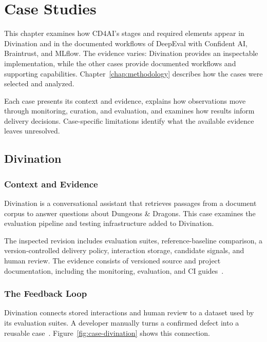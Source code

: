 \chapter{Case Studies}
\label{chap:case-studies}

This chapter examines how CD4AI's stages and required elements appear in
Divination and in the documented workflows of DeepEval with Confident AI,
Braintrust, and MLflow. The evidence varies: Divination provides an inspectable
implementation, while the other cases provide documented workflows and
supporting capabilities. Chapter~\ref{chap:methodology} describes how the cases
were selected and analyzed.

Each case presents its context and evidence, explains how observations move
through monitoring, curation, and evaluation, and examines how results inform
delivery decisions. Case-specific limitations identify what the available
evidence leaves unresolved.

\section{Divination}
\label{sec:case-divination}

\subsection{Context and Evidence}

Divination is a conversational assistant that retrieves passages from a document
corpus to answer questions about Dungeons \& Dragons. This case examines the
evaluation pipeline and testing infrastructure added to Divination.

The inspected revision includes evaluation suites, reference-baseline
comparison, a version-controlled delivery policy, interaction storage,
candidate signals, and human
review. The evidence consists of versioned source and project documentation,
including the monitoring, evaluation, and CI guides~\parencite{Divination:Monitoring,
Divination:Evaluations,Divination:CI}.

\subsection{The Feedback Loop}

Divination connects stored interactions and human review to a dataset used by
its evaluation suites. A developer manually turns a confirmed defect into a
reusable case~\parencite{Divination:Monitoring,Divination:Evaluations}.
Figure~\ref{fig:case-divination} shows this connection.

